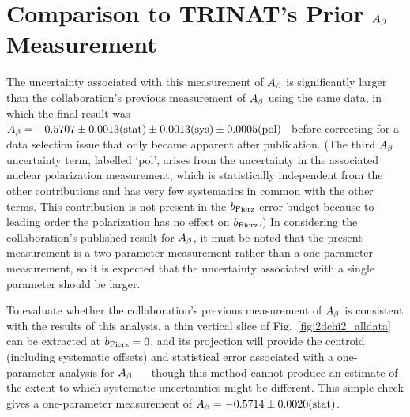 %


\section{Comparison to TRINAT's Prior $A_{\beta}$ Measurement}
\label{sec:compare_Abeta}
The uncertainty associated with this measurement of $A_{\beta}$ is significantly larger than the collaboration's previous measurement of $A_{\beta}$ using the same data, in which the final result was $\mbox{$A_{\beta} = -0.5707 \pm 0.0013(\textrm{stat}) \pm 0.0013(\textrm{sys}) \pm 0.0005(\textrm{pol})$}$~\cite{ben_Abeta} before correcting for a data selection issue that only became apparent after publication.  (The third $A_{\beta}$ uncertainty term, labelled `pol', arises from the uncertainty in the associated nuclear polarization measurement, which is statistically independent from the other contributions and has very few systematics in common with the other terms.  This contribution is not present in the $b_{\mathrm{Fierz}}$ error budget because to leading order the polarization has no effect on $b_{\mathrm{Fierz}}$.)  In considering the collaboration's published result for $A_{\beta}$, it must be noted that 
the present measurement is a two-parameter measurement rather than a one-parameter measurement, so it is expected that the uncertainty associated with a single parameter should be larger.


To evaluate whether the collaboration's previous measurement of $A_{\beta}$ is consistent with the results of this analysis, a thin vertical slice of Fig.~\ref{fig:2dchi2_alldata} can be extracted at $b_{\mathrm{Fierz}}=0$, and its projection will provide the centroid (including systematic offsets) and statistical error associated with a one-parameter analysis for $A_{\beta}$ --- though this method cannot produce an estimate of the extent to which systematic uncertainties might be different.  This simple check gives a one-parameter measurement of $A_{\beta} = -0.5714 \pm 0.0020(\textrm{stat})$.



